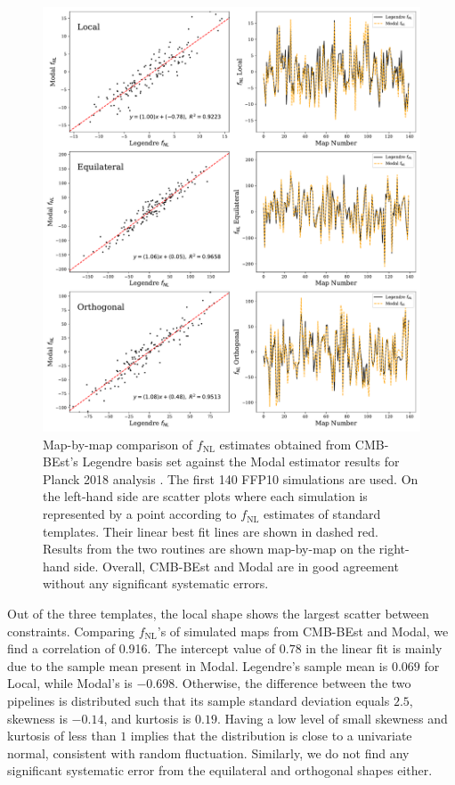 \begin{figure}[htbp!] 
	\centering    
	\includegraphics[width=\textwidth]{map_by_map_Legendre_Modal.pdf}
	\caption{Map-by-map comparison of $f_\text{NL}$ estimates obtained from CMB-BEst's Legendre basis set against the Modal estimator results for Planck 2018 analysis \cite{PlanckCollaboration2018}. The first 140 FFP10 simulations are used. On the left-hand side are scatter plots where each simulation is represented by a point according to $f_\text{NL}$ estimates of standard templates. Their linear best fit lines are shown in dashed red. Results from the two routines are shown map-by-map on the right-hand side. Overall, CMB-BEst and Modal are in good agreement without any significant systematic errors.}
	\label{fig:map_by_map_Legendre_Modal}
\end{figure}

Out of the three templates, the local shape shows the largest scatter between constraints. Comparing $f_\text{NL}$'s of simulated maps from CMB-BEst and Modal, we find a correlation of 0.916. The intercept value of $0.78$ in the linear fit is mainly due to the sample mean present in Modal. Legendre's sample mean is $0.069$ for Local, while Modal's is $-0.698$. Otherwise, the difference between the two pipelines is distributed such that its sample standard deviation equals $2.5$, skewness is $-0.14$, and kurtosis is $0.19$. Having a low level of small skewness and kurtosis of less than $1$ implies that the distribution is close to a univariate normal, consistent with random fluctuation. Similarly, we do not find any significant systematic error from the equilateral and orthogonal shapes either.

